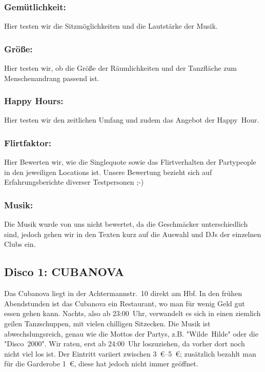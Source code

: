 \begin{multicols*}{2}
\subsubsection*{Gemütlichkeit:}
Hier testen wir die Sitzmöglichkeiten und die Lautstärke der Musik.

\subsubsection*{Größe:}
Hier testen wir, ob die Größe der Räumlichkeiten und der Tanzfläche zum Menschenandrang passend ist.

\subsubsection*{Happy Hours:}
Hier testen wir den zeitlichen Umfang und zudem das Angebot der Happy~Hour.

\subsubsection*{Flirtfaktor:}
Hier Bewerten wir, wie die Singlequote sowie das Flirtverhalten der Partypeople in den jeweiligen Locations ist. Unsere Bewertung bezieht sich auf Erfahrungsberichte diverser Testpersonen ;-)

\subsubsection*{Musik:}
Die Musik wurde von uns nicht bewertet, da die Geschmäcker unterschiedlich sind, jedoch gehen wir in den Texten kurz auf die Auswahl und DJs der einzelnen Clubs ein.

\subsection*{Disco 1: CUBANOVA}
Das Cubanova liegt in der Achtermannstr.~10 direkt am Hbf. In den frühen Abendstunden ist das Cubanova ein Restaurant, wo man für wenig Geld gut essen gehen kann. Nachts, also ab 23:00~Uhr, verwandelt es sich in einen ziemlich geilen Tanzschuppen, mit vielen chilligen Sitzecken. Die Musik ist abwechslungsreich, genau wie die Mottos der Partys, z.B. "Wilde~Hilde" oder die "Disco~2000". Wir raten, erst ab 24:00~Uhr loszuziehen, da vorher dort noch nicht viel los ist. Der Eintritt variiert zwischen \SIrange{3}{5}{\euro}; zusätzlich bezahlt man für die Garderobe \SI{1}{\euro}, diese hat jedoch nicht immer geöffnet.


\end{multicols*}

